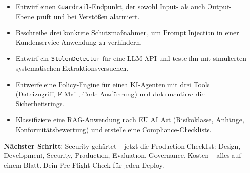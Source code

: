 \begin{itemize}[leftmargin=*]
     \item Entwirf einen \texttt{Guardrail}-Endpunkt, der sowohl Input- als auch Output-Ebene prüft und bei Verstößen alarmiert.
     \item Beschreibe drei konkrete Schutzmaßnahmen, um Prompt Injection in einer Kundenservice-Anwendung zu verhindern.
     \item Entwirf ein \texttt{StolenDetector} für eine LLM-API und teste ihn mit simulierten systematischen Extraktionsversuchen.
     \item Entwerfe eine Policy-Engine für einen KI-Agenten mit drei Tools (Dateizugriff, E-Mail, Code-Ausführung) und dokumentiere die Sicherheitsringe.
     \item Klassifiziere eine RAG-Anwendung nach EU AI Act (Risikoklasse, Anhänge, Konformitätsbewertung) und erstelle eine Compliance-Checkliste.
\end{itemize}

\textbf{Nächster Schritt:} Security gehärtet -- jetzt die Production Checklist: Design, Development, Security, Production, Evaluation, Governance, Kosten -- alles auf einem Blatt. Dein Pre-Flight-Check für jeden Deploy.
\endinput

\clearpage
